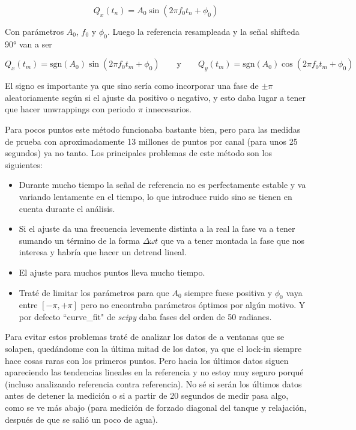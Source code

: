 \begin{equation*}
	Q_x(t_n) = A_0\sin(2\pi f_0 t_n+ \phi_0)
\end{equation*} 

Con parámetros $A_0$, $f_0$ y $\phi_0$. Luego la referencia resampleada y la señal shifteda 90° van a ser 

\begin{equation*}
	Q_x(t_m) = \text{sgn}(A_0)\sin(2\pi f_0 t_m+ \phi_0) \qquad \text{y} \qquad Q_y(t_m) = \text{sgn}(A_0)\cos(2\pi f_0 t_m+ \phi_0)
\end{equation*}

El signo es importante ya que sino sería como incorporar una fase de $\pm\pi$ aleatoriamente según si el ajuste da positivo o negativo, y esto daba lugar a tener que hacer unwrappings con periodo $\pi$ innecesarios.

Para pocos puntos este método funcionaba bastante bien, pero para las medidas de prueba con aproximadamente 13 millones de puntos por canal (para unos 25 segundos) ya no tanto. Los principales problemas de este método son los siguientes:

\begin{itemize}
	\item Durante mucho tiempo la señal de referencia no es perfectamente estable y va variando lentamente en el tiempo, lo que introduce ruido sino se tienen en cuenta durante el análisis. 
	\item Si el ajuste da una frecuencia levemente distinta a la real la fase va a tener sumando un término de la forma $\Delta\omega t$ que va a tener montada la fase que nos interesa y habría que hacer un detrend lineal. 
	\item El ajuste para muchos puntos lleva mucho tiempo. 
	\item Traté de limitar los parámetros para que $A_0$ siempre fuese positiva y $\phi_0$ vaya entre $[-\pi,+\pi]$ pero no encontraba parámetros óptimos por algún motivo. Y por defecto ``curve\_fit" de \textit{scipy} daba fases del orden de 50 radianes. 
\end{itemize}

Para evitar estos problemas traté de analizar los datos de a ventanas que se solapen, quedándome con la última mitad de los datos, ya que el lock-in siempre hace cosas raras con los primeros puntos. Pero hacia los últimos datos siguen apareciendo las tendencias lineales en la referencia y no estoy muy seguro porqué (incluso analizando referencia contra referencia). No sé si serán los últimos datos antes de detener la medición o si a partir de 20 segundos de medir pasa algo, como se ve más abajo (para medición de forzado diagonal del tanque y relajación, después de que se salió un poco de agua). 

